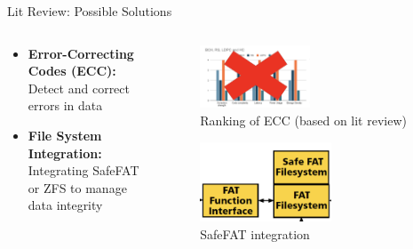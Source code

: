 \begin{frame}{Lit Review: Possible Solutions}
    \begin{columns}
        \begin{column}{0.5\textwidth}
            \begin{itemize}
                \item \textbf{Error-Correcting Codes (ECC):} Detect and correct errors in data
                \item \textbf{File System Integration:} Integrating SafeFAT or ZFS to manage data integrity
           \end{itemize}
        \end{column}
        \begin{column}{0.5\textwidth}
            \begin{figure}
                \centering
                \includegraphics[height=0.4\textheight,width=0.5\textwidth,keepaspectratio]{images/ecc_x.png}
                \caption{Ranking of ECC (based on lit review)}
            \end{figure}
            \begin{figure}
                \centering
                \includegraphics[height=0.5\textheight,width=0.6\textwidth,keepaspectratio]{images/safefat.png}
                \caption{SafeFAT integration}
            \end{figure}
        \end{column}
    \end{columns}  
\end{frame}

